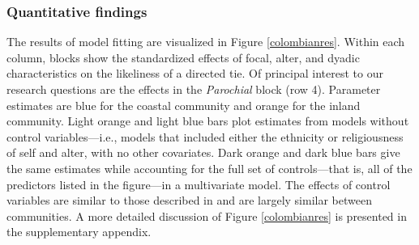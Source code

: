 \documentclass[bibauthoryear]{aa}
\begin{document}
\subsubsection{Quantitative findings}
The results of model fitting are visualized in Figure \ref{colombianres}. Within each column, blocks show the standardized effects of focal, alter, and dyadic characteristics on the likeliness of a directed tie.  Of principal interest to our research questions  are the effects in the \emph{Parochial} block (row 4). Parameter estimates are blue for the coastal community  and orange for the inland community. Light orange and light blue bars plot estimates from models without control variables---i.e., models that included either the ethnicity or religiousness of self and alter, with no other covariates. Dark orange and dark blue bars give the same estimates while accounting for the full set of controls---that is, all of the predictors listed in the figure---in a multivariate model.  The effects of control variables are similar to those described in \citet{Pisor2020} and are largely similar between communities. A more detailed discussion of Figure \ref{colombianres} is presented in the supplementary appendix. %
\end{document}
